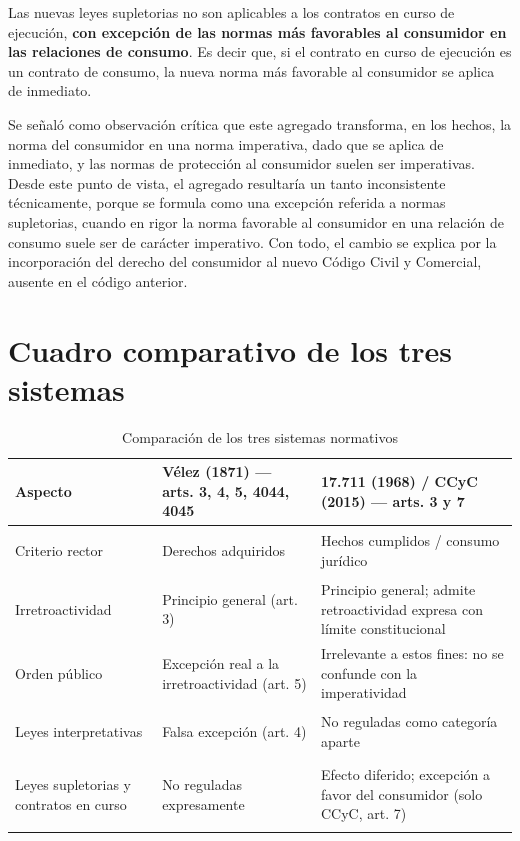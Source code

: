 \documentclass[12pt,oneside]{book}
\begin{document}
\begin{important}
Las nuevas leyes supletorias no son aplicables a los contratos en curso de ejecución, \textbf{con excepción de las normas más favorables al consumidor en las relaciones de consumo}. Es decir que, si el contrato en curso de ejecución es un contrato de consumo, la nueva norma más favorable al consumidor se aplica de inmediato.
\end{important}

\begin{note}
Se señaló como observación crítica que este agregado transforma, en los hechos, la norma del consumidor en una norma imperativa, dado que se aplica de inmediato, y las normas de protección al consumidor suelen ser imperativas. Desde este punto de vista, el agregado resultaría un tanto inconsistente técnicamente, porque se formula como una excepción referida a normas supletorias, cuando en rigor la norma favorable al consumidor en una relación de consumo suele ser de carácter imperativo. Con todo, el cambio se explica por la incorporación del derecho del consumidor al nuevo Código Civil y Comercial, ausente en el código anterior.
\end{note}

\section{Cuadro comparativo de los tres sistemas}

\begin{table}[H]
\centering
\begin{tabularx}{\textwidth}{>{\bfseries\raggedright\arraybackslash}p{} X X}
\toprule
\textbf{Aspecto} & \textbf{Vélez (1871) --- arts. 3, 4, 5, 4044, 4045} & \textbf{17.711 (1968) / CCyC (2015) --- arts. 3 y 7} \\
\midrule
Criterio rector & Derechos adquiridos & Hechos cumplidos / consumo jurídico \\
Irretroactividad & Principio general (art. 3) & Principio general; admite retroactividad expresa con límite constitucional \\
Orden público & Excepción real a la irretroactividad (art. 5) & Irrelevante a estos fines: no se confunde con la imperatividad \\
Leyes interpretativas & Falsa excepción (art. 4) & No reguladas como categoría aparte \\
Leyes supletorias y contratos en curso & No reguladas expresamente & Efecto diferido; excepción a favor del consumidor (solo CCyC, art. 7) \\
\bottomrule
\end{tabularx}
\caption{Comparación de los tres sistemas normativos}
\end{table}
\end{document}
